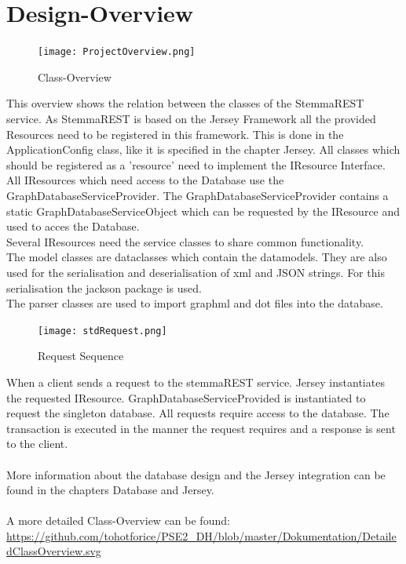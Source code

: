 \documentclass[11pt,fleqn,openany]{book} %
\begin{document}
\chapter{Design-Overview}
\begin{figure}[h!]
  \caption{Class-Overview}
  \centering
    \texttt{[image: ProjectOverview.png]}
\end{figure}
This overview shows the relation between the classes of the StemmaREST service. As StemmaREST is based on the Jersey Framework all the provided Resources need to be registered in this framework. This is done in the ApplicationConfig class, like it is specified in the chapter Jersey. All classes which should be registered as a 'resource' need to implement the IResource Interface. \\
All IResources which need access to the Database use the GraphDatabaseServiceProvider. The GraphDatabaseServiceProvider contains a static GraphDatabaseServiceObject which can be requested by the IResource and used to acces the Database.\\
Several IResources need the service classes to share common functionality.\\
The model classes are dataclasses which contain the datamodels. They are also used for the serialisation and deserialisation of xml and JSON strings. For this serialisation the jackson package is used.\\
The parser classes are used to import graphml and dot files into the database.

\begin{figure}[h!]
  \caption{Request Sequence}
  \centering
    \texttt{[image: stdRequest.png]}
\end{figure}
When a client sends a request to the stemmaREST service. Jersey instantiates the requested IResource. GraphDatabaseServiceProvided is instantiated to request the singleton database. All requests require access to the database. The transaction is executed in the manner the request requires and a response is sent to the client. 
\\ \quad \\
More information about the database design and the Jersey integration can be found in the chapters Database and Jersey. 
\\ \quad \\
A more detailed Class-Overview can be found:
\url{https://github.com/tohotforice/PSE2_DH/blob/master/Dokumentation/DetailedClassOverview.svg}
\end{document}
